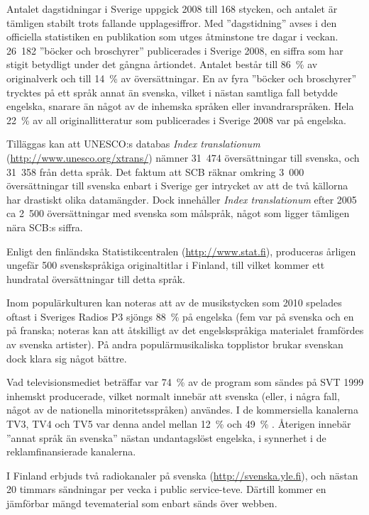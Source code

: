 \begin{multicols}{2}
Antalet dagstidningar i Sverige uppgick 2008 till 168 stycken, och
antalet är tämligen stabilt trots fallande upplagesiffror. Med
  ''dagstidning'' avses i den officiella statistiken en publikation som
  utges åtminstone tre dagar i veckan. 26~182 ''böcker och
broschyrer'' publicerades i Sverige 2008, en siffra som har stigit
betydligt under det gångna årtiondet. Antalet består till 86~\% av
originalverk och till 14~\% av översättningar. En av fyra ''böcker och
broschyrer'' trycktes på ett språk annat än svenska, vilket i nästan
samtliga fall betydde engelska, snarare än något av de inhemska
språken eller invandrarspråken. Hela 22~\% av all
originallitteratur som publicerades i Sverige 2008 var på engelska.

Tilläggas kan att UNESCO:s databas \textit{Index
  translationum} (\url{http://www.unesco.org/xtrans/}) nämner 31~474
översättningar till svenska, och 31~358 från detta språk. Det faktum
att SCB räknar omkring 3~000 översättningar till svenska enbart i
Sverige ger intrycket av att de två källorna har drastiskt olika
datamängder. Dock innehåller \textit{Index translationum} efter 2005
ca 2~500 översättningar med svenska som målspråk, något som ligger
tämligen nära SCB:s siffra.

Enligt den finländska Statistikcentralen (\url{http://www.stat.fi}),
produceras årligen ungefär 500 svenskspråkiga originaltitlar i
Finland, till vilket kommer ett hundratal översättningar till detta
språk.

Inom populärkulturen kan noteras att av de musikstycken som 2010
spelades oftast i Sveriges Radios P3\cite{p3}
sjöngs 88~\% på engelska (fem var på svenska och en på franska;
noteras kan att åtskilligt av det engelskspråkiga materialet
framfördes av svenska artister). På andra populärmusikaliska
topplistor brukar svenskan dock klara sig något bättre.

Vad televisionsmediet beträffar var 74~\% av de program som sändes på
SVT 1999 inhemskt producerade, vilket normalt innebär att svenska
(eller, i några fall, något av de nationella minoritetsspråken)
användes. I de kommersiella kanalerna TV3, TV4 och TV5 var denna andel
mellan 12~\% och 49~\% \cite[79]{falk2001}. Återigen innebär ''annat språk
än svenska'' nästan undantagslöst engelska, i synnerhet i de
reklamfinansierade kanalerna.

I Finland erbjuds två radiokanaler på svenska
(\url{http://svenska.yle.fi}), och nästan 20 timmars sändningar per
vecka i public service-teve. Därtill kommer en jämförbar mängd
tevematerial som enbart sänds över webben.


\end{multicols}
